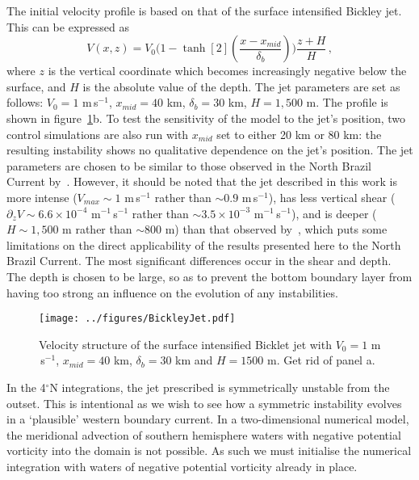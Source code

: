 The initial velocity profile is based on that of the surface intensified Bickley jet. This can be expressed as
\begin{equation}
    V(x, z) = V_0 \Bigg( 1 - \tanh[2](\frac{x - x_{mid}}{\delta_b})\Bigg) \frac{z + H}{H} \, ,
\end{equation}
where $z$ is the vertical coordinate which becomes increasingly negative below the surface, and $H$ is the absolute value of the depth. The jet parameters are set as follows: $V_0 = 1$ m\,s$^{-1}$, $x_{mid} = 40$ km, $\delta_b = 30$ km, $H = 1,500$ m. The profile is shown in figure~\ref{fig:SurfIntBickleyJet}b. To test the sensitivity of the model to the jet's position, two control simulations are also run with $x_{mid}$ set to either 20 km or 80 km: the resulting instability shows no qualitative dependence on the jet's position. The jet parameters are chosen to be similar to those observed in the North Brazil Current by~\citet{Johns1998}. However, it should be noted that the jet described in this work is more intense ($V_{max} \sim 1$ m\,s$^{-1}$ rather than $\sim 0.9$ m\,s$^{-1}$), has less vertical shear ($\partial_z V \sim 6.6\times 10^{-4}$ m$^{-1}$\,s$^{-1}$ rather than $\sim 3.5 \times 10^{-3}$ m$^{-1}$\,s$^{-1}$), and is deeper ($H\sim 1,500$ m rather than $\sim 800$ m) than that observed by~\citet{Johns1998}, which puts some limitations on the direct applicability of the results presented here to the North Brazil Current. The most significant differences occur in the shear and depth. The depth is chosen to be large, so as to prevent the bottom boundary layer from having too strong an influence on the evolution of any instabilities.

\begin{figure} 
    \centering
    \texttt{[image: ../figures/BickleyJet.pdf]}
    \caption{Velocity structure of the surface intensified Bicklet jet with $V_0 = 1$ m$\,$s$^{-1}$,  $x_{mid} = 40$ km, $\delta_b = 30$ km and $H = 1500$ m. Get rid of panel a.}
    \label{fig:SurfIntBickleyJet}
\end{figure}

In the 4$^\circ$N integrations, the jet prescribed is symmetrically unstable from the outset. This is intentional as we wish to see how a symmetric instability evolves in a `plausible' western boundary current. In a two-dimensional numerical model, the meridional advection of southern hemisphere waters with negative potential vorticity into the domain is not possible. As such we must initialise the numerical integration with waters of negative potential vorticity already in place.

